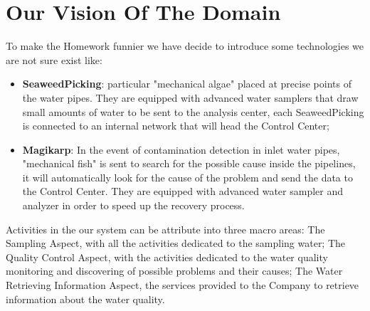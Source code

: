 \section{\textbf{Our Vision Of The Domain}}
To make the Homework funnier we have decide to introduce some technologies we are not sure exist like:
\begin{itemize}
\item \textbf{SeaweedPicking}: particular "mechanical algae" placed at precise points of the water pipes. They are equipped with advanced water samplers that draw small amounts of water to be sent to the analysis center, each SeaweedPicking is connected to an internal network that will head the Control Center;
\item \textbf{Magikarp}: In the event of contamination detection in inlet water pipes, "mechanical fish" is sent to search for the possible cause inside the pipelines, it will automatically look for the cause of the problem and send the data to the Control Center. They are equipped with advanced water sampler and analyzer in order to speed up the recovery process.
\end{itemize}
Activities in the our system can be attribute into three macro areas:
The Sampling Aspect, with all the activities dedicated to the sampling water;
The Quality Control Aspect, with the activities dedicated to the water quality monitoring and discovering of possible problems and their causes;
The Water Retrieving Information Aspect, the services provided to the Company to retrieve information about the water quality.

